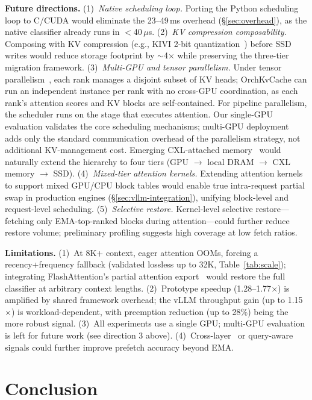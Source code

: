 \documentclass[conference]{IEEEtran}
\begin{document}
\textbf{Future directions.}
(1)~\emph{Native scheduling loop.} Porting the Python scheduling loop to C/CUDA would eliminate the 23--49\,ms overhead (\S\ref{sec:overhead}), as the native classifier already runs in $<$40\,$\mu$s.
(2)~\emph{KV compression composability.} Composing with KV compression (e.g., KIVI 2-bit quantization~\cite{kivi}) before SSD writes would reduce storage footprint by ${\sim}$4$\times$ while preserving the three-tier migration framework.
(3)~\emph{Multi-GPU and tensor parallelism.} Under tensor parallelism~\cite{megatron}, each rank manages a disjoint subset of KV heads; OrchKvCache can run an independent instance per rank with no cross-GPU coordination, as each rank's attention scores and KV blocks are self-contained. For pipeline parallelism, the scheduler runs on the stage that executes attention. Our single-GPU evaluation validates the core scheduling mechanisms; multi-GPU deployment adds only the standard communication overhead of the parallelism strategy, not additional KV-management cost. Emerging CXL-attached memory~\cite{tpp} would naturally extend the hierarchy to four tiers (GPU $\to$ local DRAM $\to$ CXL memory $\to$ SSD).
(4)~\emph{Mixed-tier attention kernels.} Extending attention kernels to support mixed GPU/CPU block tables would enable true intra-request partial swap in production engines (\S\ref{sec:vllm-integration}), unifying block-level and request-level scheduling.
(5)~\emph{Selective restore.} Kernel-level selective restore---fetching only EMA-top-ranked blocks during attention---could further reduce restore volume; preliminary profiling suggests high coverage at low fetch ratios.

\textbf{Limitations.}
(1)~At 8K+ context, eager attention OOMs, forcing a recency+frequency fallback (validated lossless up to 32K, Table~\ref{tab:scale}); integrating FlashAttention's partial attention export~\cite{flashattn2} would restore the full classifier at arbitrary context lengths.
(2)~Prototype speedup (1.28--1.77$\times$) is amplified by shared framework overhead; the vLLM throughput gain (up to 1.15$\times$) is workload-dependent, with preemption reduction (up to 28\%) being the more robust signal.
(3)~All experiments use a single GPU; multi-GPU evaluation is left for future work (see direction 3 above).
(4)~Cross-layer~\cite{infinigen} or query-aware~\cite{quest} signals could further improve prefetch accuracy beyond EMA.

\section{Conclusion}
\end{document}
